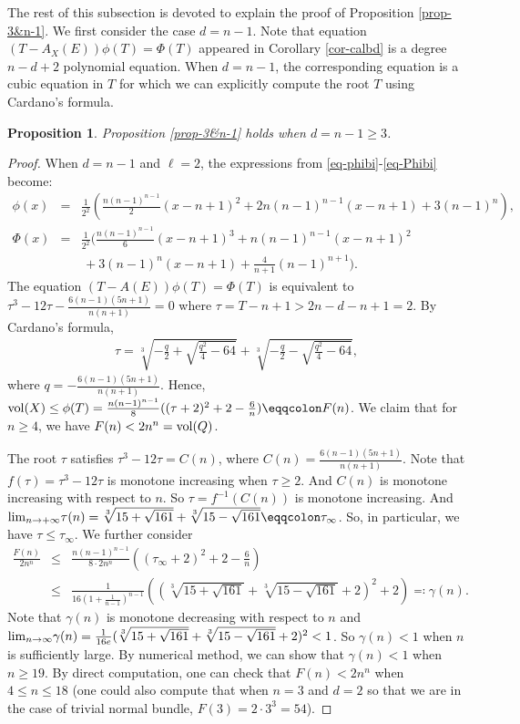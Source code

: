 \documentclass[12pt]{amsart}
\newtheorem{prop}[thm]{Proposition}
\theoremstyle{definition}
\def\lim{{\rm lim}}
\def\vol{{\rm vol}}
\begin{document}
The rest of this subsection is devoted to explain the proof of Proposition \ref{prop-3&n-1}. We first consider the case $d=n-1$. Note that equation $(T-A_X(E))\phi(T)=\Phi(T)$ appeared in Corollary \ref{cor-calbd} is a degree $n-d+2$ polynomial equation. When $d=n-1$, the corresponding equation is a cubic equation in $T$ for which we can explicitly compute the root $T$ using Cardano's formula.
\begin{prop}\label{prop-n-1}
Proposition \ref{prop-3&n-1} holds when $d=n-1\ge 3$.
\end{prop}
\begin{proof}
        When $d=n-1$ and $\ell=2$, the expressions from \eqref{eq-phibi}-\eqref{eq-Phibi} become: 
    \begin{eqnarray*}
        \phi(x) &=& \frac{1}{2^2}\left(\frac{n(n-1)^{n-1}}{2}(x-n+1)^2+2n(n-1)^{n-1}(x-n+1)+3(n-1)^n\right),\\
        \Phi(x) &=& \frac{1}{2^2}(\frac{n(n-1)^{n-1}}{6}(x-n+1)^3+n(n-1)^{n-1}(x-n+1)^2\\
        &&\, +3(n-1)^n(x-n+1)+\frac{4}{n+1}(n-1)^{n+1}).
    \end{eqnarray*}
    The equation $(T-A(E))\phi(T)=\Phi(T)$ is equivalent to $\tau^3-12\tau-\frac{6(n-1)(5n+1)}{n(n+1)}=0$ where $\tau=T-n+1>2n-d-n+1=2$.  By Cardano's formula,
    \begin{eqnarray*}
        \tau = \sqrt[3]{-\frac{q}{2}+\sqrt{\frac{q^2}{4}-64}}+\sqrt[3]{-\frac{q}{2}-\sqrt{\frac{q^2}{4}-64}},
    \end{eqnarray*}
    where $q=-\frac{6(n-1)(5n+1)}{n(n+1)}$. Hence, $\vol(X)\leq\phi(T)=\frac{n(n-1)^{n-1}}{8}((\tau+2)^2+2-\frac{6}{n})\eqqcolon F(n)$. We claim that for $n\geq 4$, we have $F(n)< 2n^n=\vol(Q)$.  
    
    The root $\tau$ satisfies $\tau^3-12\tau=C(n)$, where $C(n)=\frac{6(n-1)(5n+1)}{n(n+1)}$. Note that $f(\tau)=\tau^3-12\tau$ is monotone increasing when $\tau \geq 2$.  And $C(n)$ is monotone increasing with respect to $n$. So $\tau = f^{-1}(C(n))$ is monotone increasing. And $\lim_{n\rightarrow +\infty}\tau(n) = \sqrt[3]{15+\sqrt{161}}+\sqrt[3]{15-\sqrt{161}}\eqqcolon\tau_{\infty}$. So, in particular, we have $\tau \leq \tau_{\infty}$. We further consider \begin{eqnarray*}
        \frac{F(n)}{2n^n}&\leq& \frac{n(n-1)^{n-1}}{8\cdot 2n^n}\left((\tau_{\infty}+2)^2+2-\frac{6}{n}\right)\\
        &\leq&\frac{1}{16\left(1+\frac{1}{n-1}\right)^{n-1}}\left(\left(\sqrt[3]{15+\sqrt{161}}+\sqrt[3]{15-\sqrt{161}}+2\right)^2+2\right)\eqqcolon\gamma(n).
    \end{eqnarray*}
    Note that $\gamma(n)$ is monotone decreasing with respect to $n$ and $\lim_{n\rightarrow\infty}\gamma(n)=\frac{1}{16e}(\sqrt[3]{15+\sqrt{161}}+\sqrt[3]{15-\sqrt{161}}+2)^2<1$. So $\gamma(n)<1$ when $n$ is sufficiently large. By numerical method, we can show that $\gamma(n)<1$ when $n\geq 19$. By direct computation, one can check that $F(n)<2n^n$ when $4\le n\le 18$ (one could also compute that when $n=3$ and $d=2$ so that we are in the case of trivial normal bundle, $F(3)=2\cdot 3^3=54$). 
\end{proof}
\end{document}
